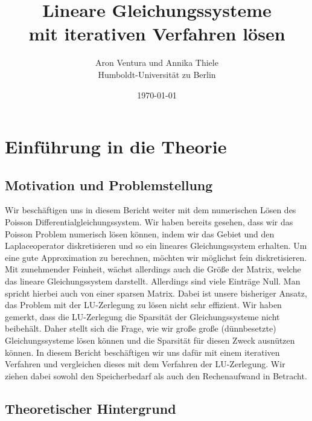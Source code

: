 \documentclass[smallheadings]{scrartcl}
\title{Lineare Gleichungssysteme\\
mit iterativen Verfahren lösen}
\author{%
 Aron Ventura und Annika Thiele\\ Humboldt-Universit\"at zu Berlin
}
\date{\today}
\theoremstyle{definition}
\begin{document}
\maketitle
\newpage
\setcounter{tocdepth}{2}
\tableofcontents
\newpage


\section{Einf\"uhrung in die Theorie}
	\subsection{Motivation und Problemstellung}
		Wir beschäftigen uns in diesem Bericht weiter mit dem numerischen Lösen des 
		Poisson Differentialgleichungssystem.  Wir haben bereits gesehen,  dass wir das 
		Poisson Problem numerisch lösen können, indem wir das Gebiet und den 
		Laplaceoperator diskretisieren und so ein lineares Gleichungssystem erhalten.  Um 
		eine gute Approximation zu berechnen,  möchten wir möglichst fein diskretisieren.  
		Mit zunehmender Feinheit,  wächst allerdings auch die Größe der Matrix,  welche 
		das lineare Gleichungssystem darstellt.  Allerdings sind viele Einträge Null. Man 
		spricht hierbei auch von einer sparsen Matrix. Dabei ist unsere bisheriger Ansatz,  
		das Problem mit der LU-Zerlegung zu lösen nicht sehr effizient.  Wir haben 
		gemerkt,  dass die LU-Zerlegung die Sparsität der Gleichungssysteme nicht 
		beibehält. Daher stellt sich die Frage,  wie wir große große (dünnbesetzte) 
		Gleichungssysteme lösen können und die Sparsität für diesen Zweck ausnützen 
		können.  In diesem Bericht beschäftigen wir uns dafür mit einem iterativen 
		Verfahren und vergleichen dieses mit dem Verfahren der LU-Zerlegung. Wir 
		ziehen dabei sowohl den Speicherbedarf als auch den Rechenaufwand in 
		Betracht. 
	\subsection{Theoretischer Hintergrund}
	
\end{document}
